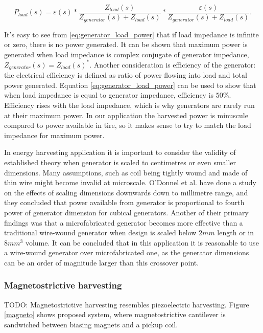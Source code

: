 \begin{equation} \label{eq:generator_load_power}
  P_{load}(s) = \varepsilon(s)*\frac{Z_{load}(s)}{Z_{generator}(s)+Z_{load}(s)}*\frac{\varepsilon(s)}{Z_{generator}(s)+Z_{load}(s)}.
\end{equation}

It's easy to see from \eqref{eq:generator_load_power} that if load impedance is infinite or zero, there is no power generated. It can be shown that maximum power is generated when load impedance is complex conjugate of generator impedance, $Z_{generator}(s) = {Z_{load}(s)}^*$. Another consideration is efficiency of the generator: the electrical efficiency is defined as ratio of power flowing into load and total power generated. Equation \eqref{eq:generator_load_power} can be used to show that when load impedance is equal to generator impedance, efficiency is $ 50 \%$. Efficiency rises with the load impedance, which is why generators are rarely run at their maximum power. In our application the harvested power is minuscule compared to power available in tire, so it makes sense to try to match the load impedance for maximum power.

In energy harvesting application it is important to consider the validity of established theory when generator is scaled to centimetres or even smaller dimensions. Many assumptions, such as coil being tightly wound and made of thin wire might become invalid at microscale. O'Donnel et al. \cite{ODonnell2007} have done a study on the effects of scaling dimensions downwards down to millimetre range, and they concluded that power available from generator is proportional to fourth power of generator dimension for cubical generators. Another of their primary findings was that a microfabricated generator becomes more effective than a traditional wire-wound generator when design is scaled below $2 mm$ length or in $8 mm^3$ volume. It can be concluded that in this application it is reasonable to use a wire-wound generator over microfabricated one, as the generator dimensions can be an order of magnitude larger than this crossover point. 

\subsubsection{Magnetostrictive harvesting}
TODO: Magnetostrictive harvesting resembles piezoelectric harvesting. Figure \ref{magneto} shows proposed system, where magnetostrictive cantilever is sandwiched between biasing magnets and a pickup coil.  

